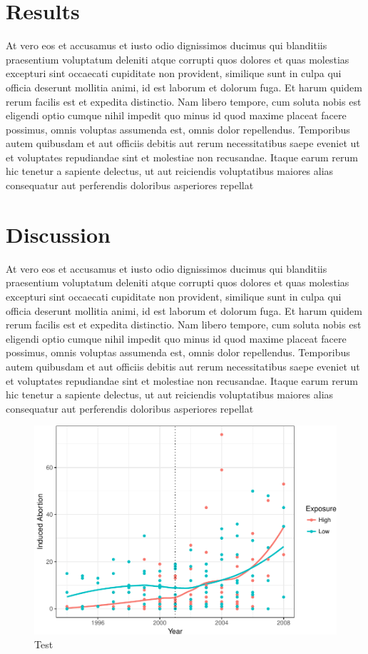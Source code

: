 \documentclass[11pt,]{article}
\makeatletter
\def\maxwidth{\ifdim\Gin@nat@width>\linewidth\linewidth
\else\Gin@nat@width\fi}
\let\Oldincludegraphics\includegraphics
\renewcommand{\includegraphics}[1]{\Oldincludegraphics[width=\maxwidth]{#1}}
\makeatother
\begin{document}
\section{Results}\label{results}

At vero eos et accusamus et iusto odio dignissimos ducimus qui
blanditiis praesentium voluptatum deleniti atque corrupti quos dolores
et quas molestias excepturi sint occaecati cupiditate non provident,
similique sunt in culpa qui officia deserunt mollitia animi, id est
laborum et dolorum fuga. Et harum quidem rerum facilis est et expedita
distinctio. Nam libero tempore, cum soluta nobis est eligendi optio
cumque nihil impedit quo minus id quod maxime placeat facere possimus,
omnis voluptas assumenda est, omnis dolor repellendus. Temporibus autem
quibusdam et aut officiis debitis aut rerum necessitatibus saepe eveniet
ut et voluptates repudiandae sint et molestiae non recusandae. Itaque
earum rerum hic tenetur a sapiente delectus, ut aut reiciendis
voluptatibus maiores alias consequatur aut perferendis doloribus
asperiores repellat

\section{Discussion}\label{discussion}

At vero eos et accusamus et iusto odio dignissimos ducimus qui
blanditiis praesentium voluptatum deleniti atque corrupti quos dolores
et quas molestias excepturi sint occaecati cupiditate non provident,
similique sunt in culpa qui officia deserunt mollitia animi, id est
laborum et dolorum fuga. Et harum quidem rerum facilis est et expedita
distinctio. Nam libero tempore, cum soluta nobis est eligendi optio
cumque nihil impedit quo minus id quod maxime placeat facere possimus,
omnis voluptas assumenda est, omnis dolor repellendus. Temporibus autem
quibusdam et aut officiis debitis aut rerum necessitatibus saepe eveniet
ut et voluptates repudiandae sint et molestiae non recusandae. Itaque
earum rerum hic tenetur a sapiente delectus, ut aut reiciendis
voluptatibus maiores alias consequatur aut perferendis doloribus
asperiores repellat

\begin{figure}
\centering
\includegraphics{final-paper_files/figure-latex/unnamed-chunk-3-1.pdf}
\caption{Test}
\end{figure}
\end{document}
